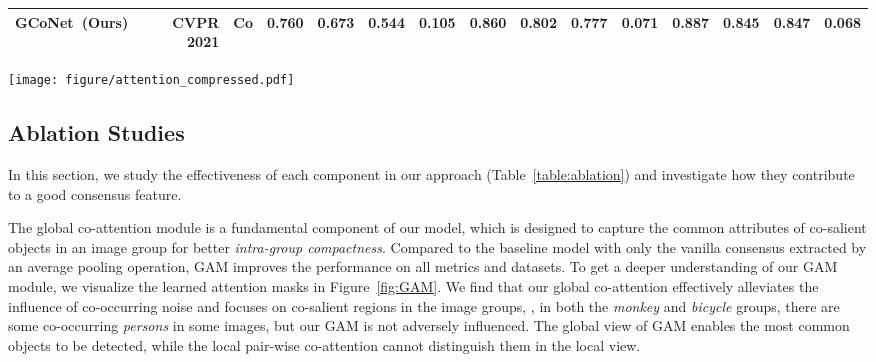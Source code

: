 \documentclass[final]{cvpr}
\def\ourmodel{GCoNet}
\begin{document}
\begin{table*}
\begin{center}
\begin{tabular}{r||r|c|cccc|cccc|cccc}
\hline
\textbf{\ourmodel~(Ours)}	& CVPR 2021 &	Co	  & \textbf{0.760} & \textbf{0.673} & \textbf{0.544} & \textbf{0.105} & \textbf{0.860} & \textbf{0.802} & \textbf{0.777} & \textbf{0.071} & \textbf{0.887} & \textbf{0.845} & \textbf{0.847} & \textbf{0.068} \\
\hline
\end{tabular}
\label{table:main}
\end{center}
\vspace{-0.1in}
\end{table*}



\begin{figure*}
\begin{center}
\texttt{[image: figure/attention\_compressed.pdf]}
\end{center}
\vspace{-5pt}
   \caption{\textbf{Visualization of affinity attention maps} learned by GAM using intra-group collaborative learning across all images in each group. Masks are sensitive to co-salient regions with shared attributes, which benefits the consensus representation learning.}
\label{fig:GAM}
\end{figure*}

\subsection{Ablation Studies}

In this section, we study the effectiveness of each component in our approach (Table~\ref{table:ablation}) and investigate how they contribute to a good consensus feature.

The global co-attention module is a fundamental component of our model, which is designed to capture the common attributes of co-salient objects in an image group for better \textit{intra-group compactness}. Compared to the baseline model with only the vanilla consensus extracted by an average pooling operation, GAM improves the performance on all  metrics and datasets. To get a deeper understanding of our GAM module, we visualize the learned attention masks in Figure~\ref{fig:GAM}. We find that our global co-attention effectively alleviates the influence of co-occurring noise and focuses on co-salient regions in the image groups, \eg, in both the {\it monkey} and {\it bicycle} groups, there are some co-occurring {\it persons} in some images, but our GAM is not adversely influenced. The global view of GAM enables the most common objects to be detected, while the local pair-wise co-attention cannot distinguish them in the local view.
\end{document}
